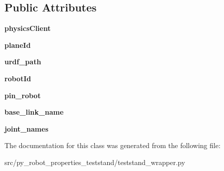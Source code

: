 \subsection*{Public Attributes}
\begin{DoxyCompactItemize}
\item 
\mbox{\label{classpy__robot__properties__teststand_1_1teststand__wrapper_1_1TeststandRobot_aa4437ff4d8945c315421b5e70d3af601}} 
{\bfseries physics\+Client}
\item 
\mbox{\label{classpy__robot__properties__teststand_1_1teststand__wrapper_1_1TeststandRobot_a04fb410e4674695ce47958757348194f}} 
{\bfseries plane\+Id}
\item 
\mbox{\label{classpy__robot__properties__teststand_1_1teststand__wrapper_1_1TeststandRobot_aec6a5a48a83dca0dd1b47c7ab368ceeb}} 
{\bfseries urdf\+\_\+path}
\item 
\mbox{\label{classpy__robot__properties__teststand_1_1teststand__wrapper_1_1TeststandRobot_a658e7fb26e593dde178f3d493fe56983}} 
{\bfseries robot\+Id}
\item 
\mbox{\label{classpy__robot__properties__teststand_1_1teststand__wrapper_1_1TeststandRobot_a5a36d31d24a80328cd648b6e3fa21888}} 
{\bfseries pin\+\_\+robot}
\item 
\mbox{\label{classpy__robot__properties__teststand_1_1teststand__wrapper_1_1TeststandRobot_a5b1f744786d19f37a6c5d271678f3c3d}} 
{\bfseries base\+\_\+link\+\_\+name}
\item 
\mbox{\label{classpy__robot__properties__teststand_1_1teststand__wrapper_1_1TeststandRobot_a59a42e2e276864865bd7052cc8ca10b5}} 
{\bfseries joint\+\_\+names}
\end{DoxyCompactItemize}


The documentation for this class was generated from the following file\+:\begin{DoxyCompactItemize}
\item 
src/py\+\_\+robot\+\_\+properties\+\_\+teststand/teststand\+\_\+wrapper.\+py\end{DoxyCompactItemize}
